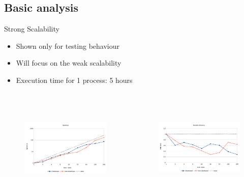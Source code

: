 \documentclass[aspectratio=169]{bredelebeamer}
\begin{document}
\subsection{Basic analysis}
\begin{frame}{Strong Scalability}
\begin{itemize}
	\item Shown only for testing behaviour
	\item Will focus on the weak scalability
	\item Execution time for 1 process: 5 hours
\end{itemize}

\begin{columns}

\begin{figure}[h!]
\centering
\includegraphics[width=6cm,height=5cm, keepaspectratio=1]{"./img/introduction/strong_scalability_speedup"}
\end{figure}

\begin{figure}[h!]
\centering
\includegraphics[width=6cm,height=5cm, keepaspectratio=1]{"./img/introduction/strong_scalability_efficiency"}
\end{figure}


\end{columns}

\end{frame}
\end{document}

